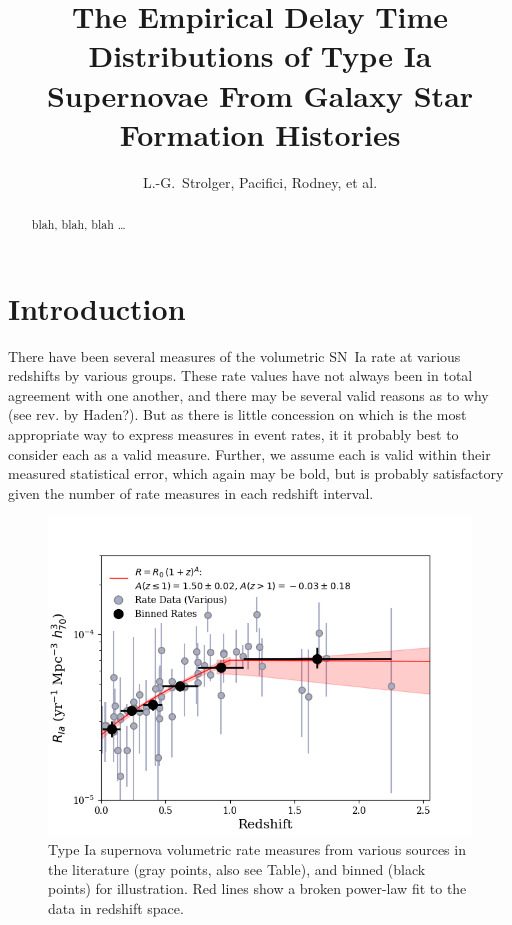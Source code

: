 \documentclass[apj]{aastex}
\begin{document}
\title{The Empirical Delay Time Distributions of Type Ia Supernovae From Galaxy Star Formation Histories}
\author{L.-G.~Strolger, Pacifici, Rodney, et al.}

\begin{abstract}
blah, blah, blah \ldots
\end{abstract}

\clearpage

\section{Introduction}
There have been several measures of the volumetric SN~Ia rate at various redshifts by various groups. These rate values have not always been in total agreement with one another, and there may be several valid reasons as to why (see rev. by Haden?). But as there is little concession on which is the most appropriate way to express measures in event rates, it it probably best to consider each as a valid measure. Further, we assume each is valid within their measured statistical error, which again may be bold, but is probably satisfactory given the number of rate measures in each redshift interval.

\begin{figure}[t]
   \centering
   \includegraphics[width=6.1in]{figure_SNIa_rate_z_pwr_fit}
   \caption{\footnotesize Type Ia supernova volumetric rate measures from various sources in the literature (gray points, also see Table), and binned (black points) for illustration. Red lines show a broken power-law fit to the data in redshift space.}
   \label{fig:sn1a_rates}
\end{figure}
\end{document}
